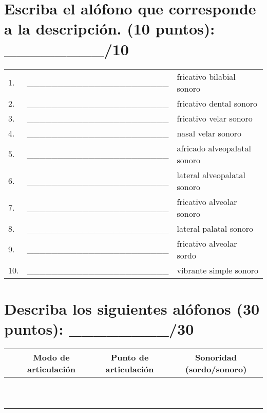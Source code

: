 \documentclass[12pt]{exam}
\begin{document}
\vspace{0.1in}

\section{Escriba el alófono que corresponde a la descripción. (10 puntos): \_\_\_\_\_\_\_\_/10}
\renewcommand{\arraystretch}{1.75}
	\begin{tabular}{@{}lll@{}}
	1.  & \_\_\_\_\_\_\_\_\_\_\_\_\_\_\_\_\_\_\_\_\_\_\_ & fricativo bilabial sonoro    \\
	2.  & \_\_\_\_\_\_\_\_\_\_\_\_\_\_\_\_\_\_\_\_\_\_\_ & fricativo dental sonoro      \\
	3.  & \_\_\_\_\_\_\_\_\_\_\_\_\_\_\_\_\_\_\_\_\_\_\_ & fricativo velar sonoro       \\
	4.  & \_\_\_\_\_\_\_\_\_\_\_\_\_\_\_\_\_\_\_\_\_\_\_ & nasal velar sonoro           \\
	5.  & \_\_\_\_\_\_\_\_\_\_\_\_\_\_\_\_\_\_\_\_\_\_\_ & africado alveopalatal sonoro \\
	6.  & \_\_\_\_\_\_\_\_\_\_\_\_\_\_\_\_\_\_\_\_\_\_\_ & lateral alveopalatal sonoro  \\
	7.  & \_\_\_\_\_\_\_\_\_\_\_\_\_\_\_\_\_\_\_\_\_\_\_ & fricativo alveolar sonoro    \\
	8.  & \_\_\_\_\_\_\_\_\_\_\_\_\_\_\_\_\_\_\_\_\_\_\_ & lateral palatal sonoro       \\
	9.  & \_\_\_\_\_\_\_\_\_\_\_\_\_\_\_\_\_\_\_\_\_\_\_ & fricativo alveolar sordo     \\
	10.	& \_\_\_\_\_\_\_\_\_\_\_\_\_\_\_\_\_\_\_\_\_\_\_ & vibrante simple sonoro       \\
	\end{tabular}

\section{Describa los siguientes alófonos (30 puntos): \_\_\_\_\_\_\_\_/30}

	\begin{center}
		\begin{tabular}{|c|c|c|c|}
			\hline
			    & Modo de articulación & Punto de articulación & Sonoridad (sordo/sonoro)\\
			\hline
			[\textgamma] & & & \\
			\hline
			[x] & & & \\
			\hline
			[r] & & & \\
			\hline
			[n] & & & \\
			\hline
			[\textsubbridge{n}] & & & \\
			\hline
			[\dh] & & & \\
			\hline
			[\textltailm] & & & \\
			\hline
			[\textbeta] & & & \\
			\hline
			[z] & & & \\
			\hline
			[\textipa{J}] & & & \\
			\hline
		\end{tabular}
	\end{center}
\end{document}
